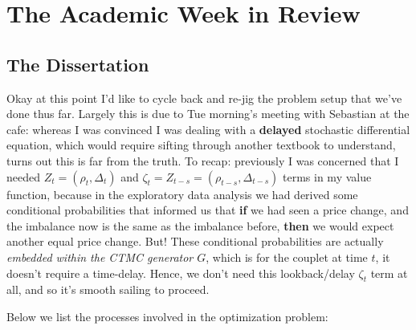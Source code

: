 \documentclass[12pt]{article}
\begin{document}
\section*{The Academic Week in Review}

\subsection*{The Dissertation}
Okay at this point I'd like to cycle back and re-jig the problem setup that we've done thus far. Largely this is due to Tue morning's meeting with Sebastian at the cafe: whereas I was convinced I was dealing with a \textbf{delayed} stochastic differential equation, which would require sifting through another textbook to understand, turns out this is far from the truth. To recap: previously I was concerned that I needed $Z_t = (\rho_t, \Delta_t) $ and $\zeta_t = Z_{t-s} = (\rho_{t-s}, \Delta_{t-s}) $ terms in my value function, because in the exploratory data analysis we had derived some conditional probabilities that informed us that \textbf{if} we had seen a price change, and the imbalance now is the same as the imbalance before, \textbf{then} we would expect another equal price change. But! These conditional probabilities are actually \textit{embedded within the CTMC generator $G$}, which is for the couplet at time $t$, it doesn't require a time-delay. Hence, we don't need this lookback/delay $\zeta_t$ term at all, and so it's smooth sailing to proceed.

Below we list the processes involved in the optimization problem:
\end{document}
